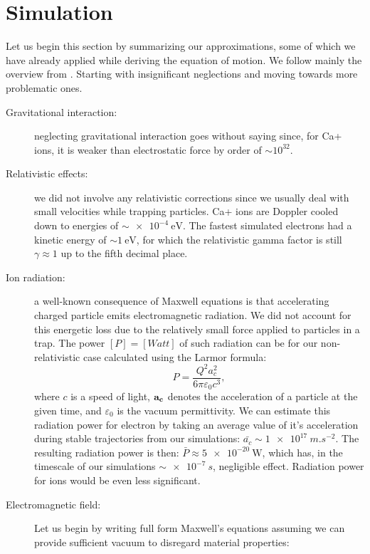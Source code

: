 \section{Simulation}
\label{sec:simulation}
Let us begin this section by summarizing our approximations, some of which we have already applied while deriving the equation of motion. We follow mainly the overview from \cite{Friedman_1982}. Starting with insignificant neglections and moving towards more problematic ones. 
\begin{description}
	\item[Gravitational interaction:] neglecting gravitational interaction goes without saying since, for Ca+ ions, it is weaker than electrostatic force by order of $\sim 10^{32}$.
	\item[Relativistic effects:] we did not involve any relativistic corrections since we usually deal with small velocities while trapping particles. Ca+ ions are Doppler cooled down to energies of $\sim \SI{e-4}{\eV}$. The fastest simulated electrons had a kinetic energy of $\sim \SI{1}{\eV}$, for which the relativistic gamma factor is still $\gamma \approx  1$ up to the fifth decimal place.
	\item[Ion radiation:] a well-known consequence of Maxwell equations is that accelerating charged particle emits electromagnetic radiation. We did not account for this energetic loss due to the relatively small force applied to particles in a trap. The power $[P] = [Watt]$ of such radiation can be for our non-relativistic case calculated using \cite{larmor1897lxiii} the Larmor formula: $$P = \dfrac{Q^2 a_c^2}{6 \pi \varepsilon_0 c^3},$$ where $c$ is a speed of light, $\vb{a_c}$ denotes the acceleration of a particle at the given time, and $\varepsilon_0$ is the vacuum permittivity. We can estimate this radiation power for electron by taking an average value of it's acceleration during stable trajectories from our simulations: $\bar{a_c} \sim \SI{1e17}{m.s^{-2}}$. The resulting radiation power is then: $\bar{P} \approx \SI{5e-20}{\watt}$, which has, in the timescale of our simulations $\sim \SI{e-7}{s}$, negligible effect. Radiation power for ions would be even less significant.
	\item[Electromagnetic field:] Let us begin by writing full form Maxwell's equations assuming we can provide sufficient vacuum to disregard material properties:
\begin{subequations}
\label{full maxwell}
\begin{align}

\end{align}
\end{subequations}
\end{description}
